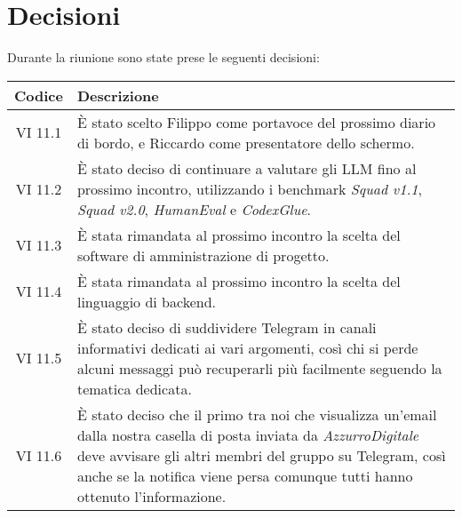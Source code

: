 
\section{Decisioni}

Durante la riunione sono state prese le seguenti decisioni:

\vspace{0.5cm}

\begin{table}[htbp]
    \centering
    \begin{tabular}{|c|p{}|}
        \hline
        \rowcolor[gray]{0.75}
        \textbf{Codice} & \textbf{Descrizione}\\
        \hline
        VI 11.1 & È stato scelto Filippo come portavoce del prossimo diario di bordo, e Riccardo come presentatore dello schermo.\\
        \hline
        VI 11.2 & È stato deciso di continuare a valutare gli LLM fino al prossimo incontro, utilizzando i benchmark \emph{Squad v1.1}, \emph{Squad v2.0}, 
        \emph{HumanEval} e \emph{CodexGlue}.\\
        \hline
        VI 11.3 & È stata rimandata al prossimo incontro la scelta del software di amministrazione di progetto.\\
        \hline
        VI 11.4 & È stata rimandata al prossimo incontro la scelta del linguaggio di backend.\\
        \hline
        VI 11.5 & È stato deciso di suddividere Telegram in canali informativi dedicati ai vari argomenti, così chi si perde alcuni messaggi può 
        recuperarli più facilmente seguendo la tematica dedicata.\\
        \hline
        VI 11.6 & È stato deciso che il primo tra noi che visualizza un'email dalla nostra casella di posta inviata da \emph{AzzurroDigitale} deve avvisare
        gli altri membri del gruppo su Telegram, così anche se la notifica viene persa comunque tutti hanno ottenuto l'informazione.\\
        \hline
    \end{tabular}
\end{table}